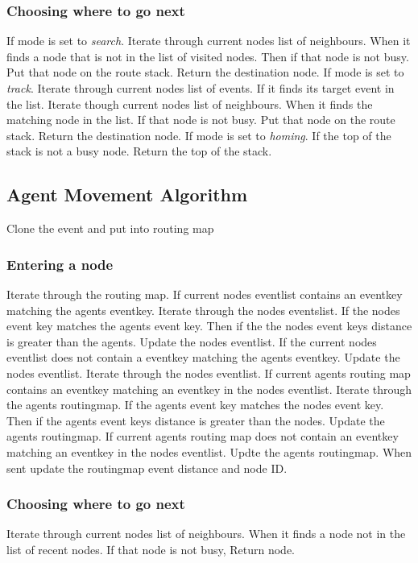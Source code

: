 \documentclass[a4paper,11pt,twoside]{article}
\begin{document}
\subsubsection{Choosing where to go next}
If mode is set to \textit{search}. Iterate through current nodes list
of neighbours.  When it finds a node that is not in the list of
visited nodes. Then if that node is not busy. Put that node on the
route stack. Return the destination node. If mode is set to
\textit{track}. Iterate through current nodes list of events. If it
finds its target event in the list. Iterate though current nodes
list of neighbours. When it finds the matching node in the list.  If
that node is not busy. Put that node on the route stack. Return the
destination node. If mode is set to \textit{homing}. If the top of the
stack is not a busy node. Return the top of the stack.

\subsection{Agent Movement Algorithm}
Clone the event and put into routing map
\subsubsection{Entering a node}
Iterate through the routing map. If current nodes eventlist contains
an eventkey matching the agents eventkey. Iterate through the nodes
eventslist. If the nodes event key matches the agents event key. Then
if the the nodes event keys distance is greater than the
agents. Update the nodes eventlist. If the current nodes eventlist
does not contain a eventkey matching the agents eventkey. Update the
nodes eventlist. Iterate through the nodes eventlist. If current
agents routing map contains an eventkey matching an eventkey in the
nodes eventlist.  Iterate through the agents routingmap.  If the
agents event key matches the nodes event key. Then if the agents event
keys distance is greater than the nodes. Update the agents
routingmap. If current agents routing map does not contain an eventkey
matching an eventkey in the nodes eventlist. Updte the agents
routingmap. When sent update the routingmap event distance and node
ID.

\subsubsection{Choosing where to go next}
Iterate through current nodes list of neighbours. When it finds a node
not in the list of recent nodes. If that node is not busy, Return node.
\end{document}
